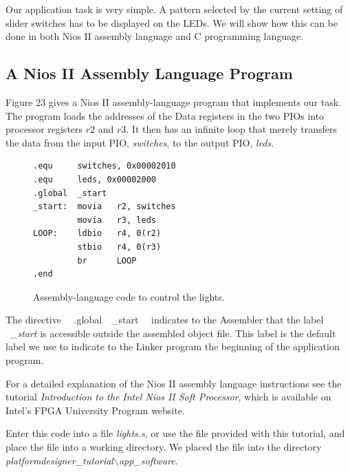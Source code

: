 \documentclass[11pt, twoside, pdftex]{article}
\begin{document}
Our application task is very simple. A pattern selected by the current setting of slider 
switches has to be displayed on the LEDs. We will show how this can be done in both
Nios II assembly language and C programming language.

\subsection{A Nios II Assembly Language Program}
Figure 23 gives a Nios II assembly-language program that implements our task. 
The program loads the addresses of the Data registers in the two PIOs
into processor registers $r2$ and $r3$. It then has an infinite loop that merely
transfers the data from the input PIO, {\it switches}, to the output PIO, {\it leds}.

\begin{figure}[H]
\begin{center}
\begin{lstlisting}[style=defaultNiosStyle, xleftmargin=4cm]
.equ     switches, 0x00002010
.equ     leds, 0x00002000
.global  _start
_start:  movia   r2, switches
         movia   r3, leds
LOOP:    ldbio   r4, 0(r2)
         stbio   r4, 0(r3)
         br      LOOP
.end
\end{lstlisting}
\end{center}
	\caption{Assembly-language code to control the lights.}
	\label{fig:24}
\end{figure}

The directive ~~.global~~\_start ~~indicates
to the Assembler that the label  ~{\it \_start} is accessible outside the
assembled object file. This label is the default label we use to indicate to
the Linker program the beginning of the application program.

For a detailed explanation of the Nios II assembly language instructions see
the tutorial {\it Introduction to the Intel Nios II Soft Processor},
which is available on Intel's FPGA University Program website.

Enter this code into a file {\it lights.s}, or use the file provided with this tutorial,
and place the file into a working directory. We placed the file into the directory 
{\it platformdesigner\_tutorial$\backslash$app\_software}.
\end{document}

